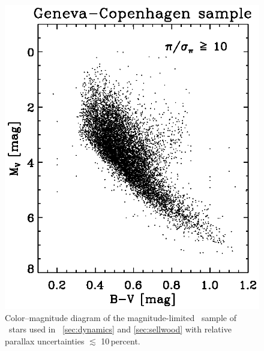 \clearpage
\begin{figure}
\includegraphics{figs_groups/gcs_cmd.ps}
\caption[Color--magnitude diagram of the magnitude-limited \gcsabb\
  sample of \ngcsstars\ stars used in
  \sectionname\sectionname~\ref{sec:dynamics} and
  \ref{sec:sellwood}]{Color--magnitude diagram of the
  magnitude-limited \gcsabb\ sample of \ngcsstars\ stars used in
  \sectionname\sectionname~\ref{sec:dynamics} and \ref{sec:sellwood}
  with relative parallax uncertainties $\lesssim$
  10\,percent.}\label{fig:gcs_cmd}
\end{figure}


